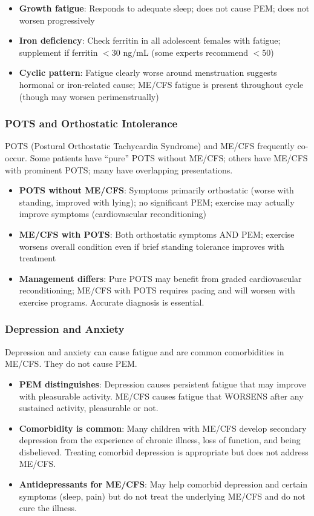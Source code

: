 \begin{itemize}
    \item \textbf{Growth fatigue}: Responds to adequate sleep; does not cause PEM; does not worsen progressively
    \item \textbf{Iron deficiency}: Check ferritin in all adolescent females with fatigue; supplement if ferritin $<$30 ng/mL (some experts recommend $<$50)
    \item \textbf{Cyclic pattern}: Fatigue clearly worse around menstruation suggests hormonal or iron-related cause; ME/CFS fatigue is present throughout cycle (though may worsen perimenstrually)
\end{itemize}

\subsubsection{POTS and Orthostatic Intolerance}

POTS (Postural Orthostatic Tachycardia Syndrome) and ME/CFS frequently co-occur. Some patients have ``pure'' POTS without ME/CFS; others have ME/CFS with prominent POTS; many have overlapping presentations.

\begin{itemize}
    \item \textbf{POTS without ME/CFS}: Symptoms primarily orthostatic (worse with standing, improved with lying); no significant PEM; exercise may actually improve symptoms (cardiovascular reconditioning)
    \item \textbf{ME/CFS with POTS}: Both orthostatic symptoms AND PEM; exercise worsens overall condition even if brief standing tolerance improves with treatment
    \item \textbf{Management differs}: Pure POTS may benefit from graded cardiovascular reconditioning; ME/CFS with POTS requires pacing and will worsen with exercise programs. Accurate diagnosis is essential.
\end{itemize}

\subsubsection{Depression and Anxiety}

Depression and anxiety can cause fatigue and are common comorbidities in ME/CFS. They do not cause PEM.

\begin{itemize}
    \item \textbf{PEM distinguishes}: Depression causes persistent fatigue that may improve with pleasurable activity. ME/CFS causes fatigue that WORSENS after any sustained activity, pleasurable or not.
    \item \textbf{Comorbidity is common}: Many children with ME/CFS develop secondary depression from the experience of chronic illness, loss of function, and being disbelieved. Treating comorbid depression is appropriate but does not address ME/CFS.
    \item \textbf{Antidepressants for ME/CFS}: May help comorbid depression and certain symptoms (sleep, pain) but do not treat the underlying ME/CFS and do not cure the illness.
\end{itemize}

